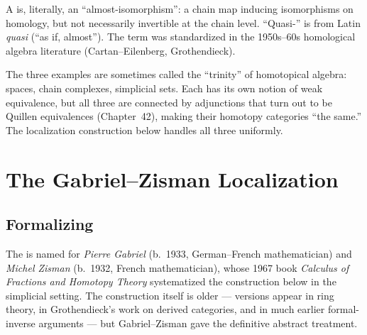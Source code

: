 \begin{nameorigin}
A  is, literally, an ``almost-isomorphism'': a
chain map inducing isomorphisms on homology, but not necessarily
invertible at the chain level. ``Quasi-'' is from Latin \emph{quasi}
(``as if, almost''). The term was standardized in the 1950s--60s
homological algebra literature (Cartan--Eilenberg, Grothendieck).
\end{nameorigin}

\begin{readernote}
The three examples are sometimes called the ``trinity'' of homotopical
algebra: spaces, chain complexes, simplicial sets. Each has its own
notion of weak equivalence, but all three are connected by adjunctions
that turn out to be Quillen equivalences (Chapter~42), making their
homotopy categories ``the same.'' The localization construction below
handles all three uniformly.
\end{readernote}


\section{The Gabriel--Zisman Localization}
\label{sec:gz-localization}

\subsection{Formalizing}

\begin{nameorigin}
The  is named for \emph{Pierre Gabriel}
(b.~1933, German--French mathematician) and \emph{Michel Zisman}
(b.~1932, French mathematician), whose 1967 book \emph{Calculus of
Fractions and Homotopy Theory} systematized the construction below in
the simplicial setting. The construction itself is older — versions
appear in ring theory, in Grothendieck's work on derived categories,
and in much earlier formal-inverse arguments — but Gabriel--Zisman
gave the definitive abstract treatment.
\end{nameorigin}

